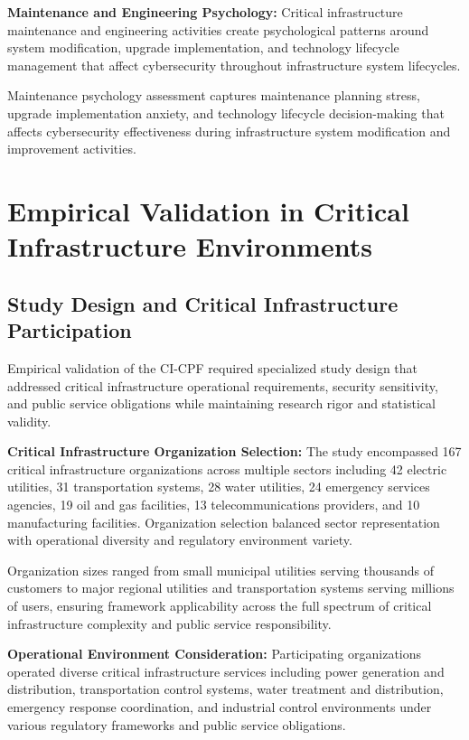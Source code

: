 \documentclass[10pt, twocolumn]{article}
\begin{document}
\textbf{Maintenance and Engineering Psychology:} Critical infrastructure maintenance and engineering activities create psychological patterns around system modification, upgrade implementation, and technology lifecycle management that affect cybersecurity throughout infrastructure system lifecycles.

Maintenance psychology assessment captures maintenance planning stress, upgrade implementation anxiety, and technology lifecycle decision-making that affects cybersecurity effectiveness during infrastructure system modification and improvement activities.

\section{Empirical Validation in Critical Infrastructure Environments}

\subsection{Study Design and Critical Infrastructure Participation}

Empirical validation of the CI-CPF required specialized study design that addressed critical infrastructure operational requirements, security sensitivity, and public service obligations while maintaining research rigor and statistical validity.

\textbf{Critical Infrastructure Organization Selection:} The study encompassed 167 critical infrastructure organizations across multiple sectors including 42 electric utilities, 31 transportation systems, 28 water utilities, 24 emergency services agencies, 19 oil and gas facilities, 13 telecommunications providers, and 10 manufacturing facilities. Organization selection balanced sector representation with operational diversity and regulatory environment variety.

Organization sizes ranged from small municipal utilities serving thousands of customers to major regional utilities and transportation systems serving millions of users, ensuring framework applicability across the full spectrum of critical infrastructure complexity and public service responsibility.

\textbf{Operational Environment Consideration:} Participating organizations operated diverse critical infrastructure services including power generation and distribution, transportation control systems, water treatment and distribution, emergency response coordination, and industrial control environments under various regulatory frameworks and public service obligations.
\end{document}
